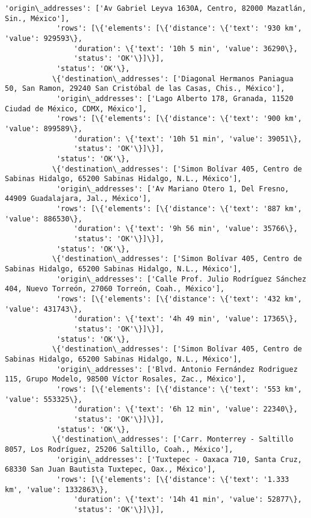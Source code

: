 \documentclass[11pt]{article}
\begin{document}
\begin{Verbatim}[commandchars=\\\{\}]
            'origin\_addresses': ['Av Gabriel Leyva 1630A, Centro, 82000 Mazatlán, Sin., México'],
            'rows': [\{'elements': [\{'distance': \{'text': '930 km', 'value': 929593\},
                'duration': \{'text': '10h 5 min', 'value': 36290\},
                'status': 'OK'\}]\}],
            'status': 'OK'\},
           \{'destination\_addresses': ['Diagonal Hermanos Paniagua 50, San Ramon, 29240 San Cristóbal de las Casas, Chis., México'],
            'origin\_addresses': ['Lago Alberto 178, Granada, 11520 Ciudad de México, CDMX, México'],
            'rows': [\{'elements': [\{'distance': \{'text': '900 km', 'value': 899589\},
                'duration': \{'text': '10h 51 min', 'value': 39051\},
                'status': 'OK'\}]\}],
            'status': 'OK'\},
           \{'destination\_addresses': ['Simon Bolívar 405, Centro de Sabinas Hidalgo, 65200 Sabinas Hidalgo, N.L., México'],
            'origin\_addresses': ['Av Mariano Otero 1, Del Fresno, 44909 Guadalajara, Jal., México'],
            'rows': [\{'elements': [\{'distance': \{'text': '887 km', 'value': 886530\},
                'duration': \{'text': '9h 56 min', 'value': 35766\},
                'status': 'OK'\}]\}],
            'status': 'OK'\},
           \{'destination\_addresses': ['Simon Bolívar 405, Centro de Sabinas Hidalgo, 65200 Sabinas Hidalgo, N.L., México'],
            'origin\_addresses': ['Calle Prof. Julio Rodríguez Sánchez 404, Nuevo Torreón, 27060 Torreón, Coah., México'],
            'rows': [\{'elements': [\{'distance': \{'text': '432 km', 'value': 431743\},
                'duration': \{'text': '4h 49 min', 'value': 17365\},
                'status': 'OK'\}]\}],
            'status': 'OK'\},
           \{'destination\_addresses': ['Simon Bolívar 405, Centro de Sabinas Hidalgo, 65200 Sabinas Hidalgo, N.L., México'],
            'origin\_addresses': ['Blvd. Antonio Fernández Rodriguez 115, Grupo Modelo, 98500 Víctor Rosales, Zac., México'],
            'rows': [\{'elements': [\{'distance': \{'text': '553 km', 'value': 553325\},
                'duration': \{'text': '6h 12 min', 'value': 22340\},
                'status': 'OK'\}]\}],
            'status': 'OK'\},
           \{'destination\_addresses': ['Carr. Monterrey - Saltillo 8057, Los Rodríguez, 25206 Saltillo, Coah., México'],
            'origin\_addresses': ['Tuxtepec - Oaxaca 710, Santa Cruz, 68330 San Juan Bautista Tuxtepec, Oax., México'],
            'rows': [\{'elements': [\{'distance': \{'text': '1.333 km', 'value': 1332863\},
                'duration': \{'text': '14h 41 min', 'value': 52877\},
                'status': 'OK'\}]\}],

\end{Verbatim}
\end{document}
